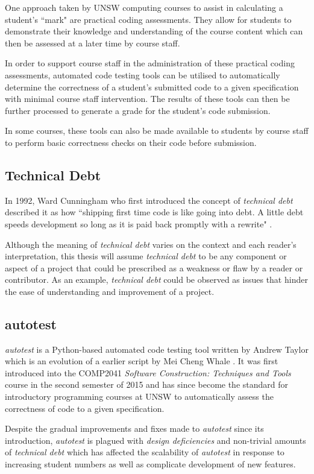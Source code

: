 \documentclass[hidelinks]{report}
\begin{document}
One approach taken by UNSW computing courses to assist in calculating a student's ``mark" are practical coding assessments. They allow for students to demonstrate their knowledge and understanding of the course content which can then be assessed at a later time by course staff.

In order to support course staff in the administration of these practical coding assessments, automated code testing tools can be utilised to automatically determine the correctness of a student's submitted code to a given specification with minimal course staff intervention. The results of these tools can then be further processed to generate a grade for the student's code submission.

In some courses, these tools can also be made available to students by course staff to perform basic correctness checks on their code before submission. 

\subsection{Technical Debt}
In 1992, Ward Cunningham who first introduced the concept of \textit{technical debt} described it as how ``shipping first time code is like going into debt. A little debt speeds development so long as it is paid back promptly with a rewrite" \cite{TechnicalDebtConcept}.

Although the meaning of \textit{technical debt} varies on the context and each reader's interpretation, this thesis will assume \textit{technical debt} to be any component or aspect of a project that could be prescribed as a weakness or flaw by a reader or contributor. As an example, \textit{technical debt} could be observed as issues that hinder the ease of understanding and improvement of a project. 

\subsection{autotest}
\textit{autotest} is a Python-based automated code testing tool written by Andrew Taylor which is an evolution of a earlier script by Mei Cheng Whale \cite{Autotest}. It was first introduced into the COMP2041 \textit{Software Construction: Techniques and Tools} course in the second semester of 2015 and has since become the standard for introductory programming courses at UNSW to automatically assess the correctness of code to a given specification.

Despite the gradual improvements and fixes made to \textit{autotest} since its introduction, \textit{autotest} is plagued with \textit{design deficiencies} and non-trivial amounts of \textit{technical debt} which has affected the scalability of \textit{autotest} in response to increasing student numbers as well as complicate development of new features.
\end{document}

